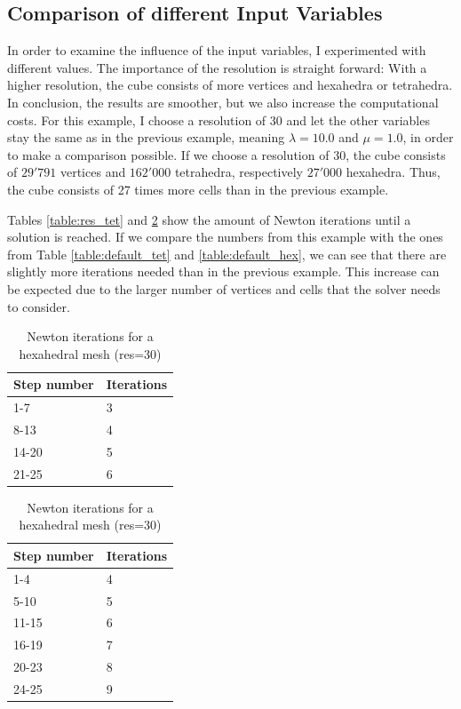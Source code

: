 \subsection{Comparison of different Input Variables}
\label{ss:comparison_diff_vars}
In order to examine the influence of the input variables, I experimented with different values. The importance of the resolution is straight forward: With a higher resolution, the cube consists of more vertices and hexahedra or tetrahedra. In conclusion, the results are smoother, but we also increase the computational costs. 
For this example, I choose a resolution of 30 and let the other variables stay the same as in the previous example, meaning $\lambda = 10.0$ and $\mu = 1.0$, in order to make a comparison possible. If we choose a resolution of $30$, the cube consists of $29'791$ vertices and $162'000$ tetrahedra, respectively $27'000$ hexahedra. Thus, the cube consists of 27 times more cells than in the previous example.

Tables \ref{table:res_tet} and \ref{table:res_hex} show the amount of Newton iterations until a solution is reached. If we compare the numbers from this example with the ones from Table \ref{table:default_tet} and \ref{table:default_hex}, we can see that there are slightly more iterations needed than in the previous example. This increase can be expected due to the larger number of vertices and cells that the solver needs to consider.

\begin{table}[!htbp]
\parbox{.45\linewidth}{
\centering
\begin{tabular}{ | l | l |}
\hline
\textbf{Step number} & \textbf{Iterations} \\ \hline
1-7 & 3 \\ \hline
8-13 & 4 \\ \hline
14-20 & 5 \\ \hline
21-25 & 6 \\ \hline
\end{tabular}
\caption{Newton iterations for a tetrahedral mesh (res=30)}
\label{table:res_tet}
}
\hfill
\parbox{.45\linewidth}{
\centering
\begin{tabular}{ | l | l |}
\hline
\textbf{Step number} & \textbf{Iterations} \\ \hline
1-4 & 4 \\ \hline
5-10 & 5 \\ \hline
11-15 & 6 \\ \hline
16-19 & 7 \\ \hline
20-23 & 8 \\ \hline
24-25 & 9 \\ \hline
\end{tabular}
\caption{Newton iterations for a hexahedral mesh (res=30)}
\label{table:res_hex}
}
\end{table}

